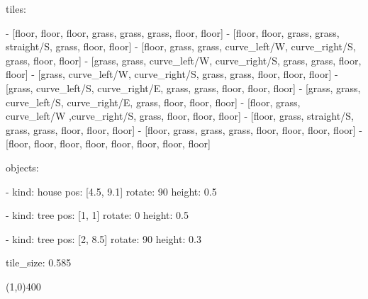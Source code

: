 \noindent tiles:\newline

\noindent- [floor, floor, floor, grass, grass, grass, floor, floor]\newline
\noindent- [floor, floor, grass, grass, straight/S, grass, floor, floor]\newline
\noindent- [floor, grass, grass, curve\_left/W, curve\_right/S, grass, floor, floor]\newline
\noindent- [grass, grass, curve\_left/W, curve\_right/S, grass, grass, floor, floor]\newline
\noindent- [grass, curve\_left/W, curve\_right/S, grass, grass, floor, floor, floor]\newline
\noindent- [grass, curve\_left/S, curve\_right/E, grass, grass, floor, floor, floor]\newline
\noindent- [grass, grass, curve\_left/S, curve\_right/E, grass, floor, floor, floor]\newline
\noindent- [floor, grass, curve\_left/W ,curve\_right/S, grass, floor, floor, floor]\newline
\noindent- [floor, grass, straight/S, grass, grass, floor, floor, floor]\newline
\noindent- [floor, grass, grass, grass, floor, floor, floor, floor]\newline
\noindent- [floor, floor, floor, floor, floor, floor, floor, floor]\newline

\noindent objects:\newline

\noindent- kind: house\newline
  pos: [4.5, 9.1]\newline
  rotate: 90\newline
  height: 0.5\newline

\noindent- kind: tree\newline
  pos: [1, 1]\newline
  rotate: 0\newline
  height: 0.5\newline

\noindent- kind: tree\newline
  pos: [2, 8.5]\newline
  rotate: 90\newline
  height: 0.3\newline

\noindent tile\_size: 0.585\newline
\begin{center}
    \line(1,0){400}
\end{center}


